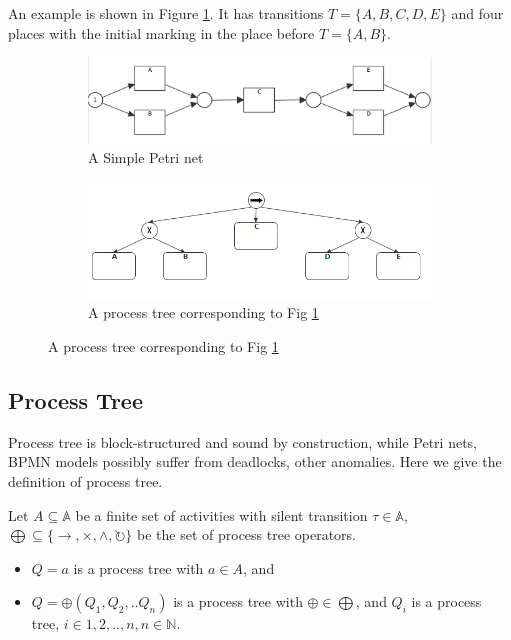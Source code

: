 An example is shown in Figure \ref{fig:pn-seq-2}. It has transitions $T=\{A,B,C,D,E\}$ and four places with the initial marking in the place before $T=\{A,B\}$. 
\begin{figure}[!h]
	\centering
	\begin{subfigure}[b]{0.45\textwidth}
		\centering
		\includegraphics[width=\linewidth]{figures/preliminary/PN06_Seq_2_xor_notnested.png}
		\caption{A Simple Petri net}
		\label{fig:pn-seq-2}
	\end{subfigure}%
	\quad
	\begin{subfigure}[b]{0.45\textwidth}
		\centering
		\includegraphics[width=\linewidth]{figures/preliminary/PT06_Seq_2_xor_notnested.png}
		\caption{A process tree corresponding to Fig \ref{fig:pn-seq-2}}
		\label{fig:pt-seq-2}
	\end{subfigure}%
\end{figure}

\subsection{Process Tree}
Process tree is block-structured and sound by construction, while Petri nets, BPMN models possibly suffer from deadlocks, other anomalies\cite{van2016data}. Here we give the definition of process tree.
\begin{definition}
Let $ A \subseteq \mathbb{A} $ be a finite set of activities with silent transition $\tau \in \mathbb{A}$, $\bigoplus \subseteq \{\rightarrow, \times, \land, \circlearrowright\}$ be the set of process tree operators. 
\begin{itemize}
\item $Q=a$ is a process tree with $a\in A$, and 
\item $Q= \oplus (Q_1 , Q_2 ,.. Q_n)$ is a process tree with $\oplus \in \bigoplus$, and $Q_i$ is a process tree, $i\in{1,2,..,n}, n\in \mathbb{N}$. 
\end{itemize}
\end{definition}

